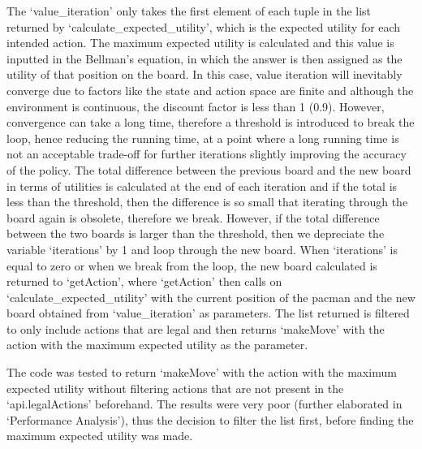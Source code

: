 \documentclass[12pt]{report}
\begin{document}
        The `value\_iteration' only takes the first element of each tuple in the list returned by `calculate\_expected\_utility', which is the expected utility for each intended action. The maximum expected utility is calculated and this value is inputted in the Bellman's equation, in which the answer is then assigned as the utility of that position on the board.
        \newline \newline
        In this case, value iteration will inevitably converge due to factors like the state and action space are finite and although the environment is continuous, the discount factor is less than 1 (0.9). However, convergence can take a long time, therefore a threshold is introduced to break the loop, hence reducing the running time, at a point where a long running time is not an acceptable trade-off for further iterations slightly improving the accuracy of the policy.
        \newline \newline
        The total difference between the previous board and the new board in terms of utilities is calculated at the end of each iteration and if the total is less than the threshold, then the difference is so small that iterating through the board again is obsolete, therefore we break. However, if the total difference between the two boards is larger than the threshold, then we depreciate the variable `iterations' by 1 and loop through the new board. When `iterations' is equal to zero or when we break from the loop, the new board calculated is returned to `getAction', where `getAction' then calls on `calculate\_expected\_utility' with the current position of the pacman and the new board obtained from `value\_iteration' as parameters. The list returned is filtered to only include actions that are legal and then returns `makeMove' with the action with the maximum expected utility as the parameter.

        The code was tested to return `makeMove' with the action with the maximum expected utility without filtering actions that are not present in the `api.legalActions' beforehand. The results were very poor (further elaborated in `Performance Analysis'), thus the decision to filter the list first, before finding the maximum expected utility was made.
\end{document}
